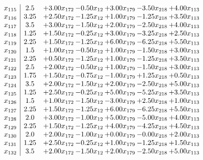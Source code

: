 \documentclass[8pt]{article}
\begin{document}
\[\begin{array}{c| c c@{\hskip 2pt} c@{\hskip 2pt} c@{\hskip 2pt} c@{\hskip 2pt} c@{\hskip 2pt} }
 x_{115}   &  2.5 & +  3.00 x_{172} & -0.50 x_{12} & +  3.00 x_{179} & -3.50 x_{218} & +  4.00 x_{113}\\
 x_{116}   &  3.25 & +  2.50 x_{172} & -1.25 x_{12} & +  1.00 x_{179} & -1.25 x_{218} & +  3.50 x_{113}\\
 x_{117}   &  3.5 & +  3.00 x_{172} & -1.50 x_{12} & +  2.00 x_{179} & -2.50 x_{218} & +  4.00 x_{113}\\
 x_{118}   &  1.25 & +  1.50 x_{172} & -0.25 x_{12} & +  3.00 x_{179} & -3.25 x_{218} & +  2.50 x_{113}\\
 x_{119}   &  2.25 & +  1.50 x_{172} & -1.25 x_{12} & +  6.00 x_{179} & -6.25 x_{218} & +  5.50 x_{113}\\
 x_{120}   &  1.5 & +  1.00 x_{172} & -0.50 x_{12} & +  1.00 x_{179} & -1.50 x_{218} & +  3.00 x_{113}\\
 x_{121}   &  2.25 & +  0.50 x_{172} & -1.25 x_{12} & +  1.00 x_{179} & -1.25 x_{218} & +  3.50 x_{113}\\
 x_{122}   &  2.5 & +  2.00 x_{172} & -0.50 x_{12} & +  1.00 x_{179} & -1.50 x_{218} & +  3.00 x_{113}\\
 x_{123}   &  1.75 & +  1.50 x_{172} & -0.75 x_{12} & -1.00 x_{179} & +  1.25 x_{218} & +  0.50 x_{113}\\
 x_{124}   &  3.5 & +  2.00 x_{172} & -1.50 x_{12} & +  2.00 x_{179} & -2.50 x_{218} & +  5.00 x_{113}\\
 x_{125}   &  1.25 & +  2.50 x_{172} & -0.25 x_{12} & +  5.00 x_{179} & -5.25 x_{218} & +  3.50 x_{113}\\
 x_{126}   &  1.5 & +  1.00 x_{172} & -1.50 x_{12} & -3.00 x_{179} & +  2.50 x_{218} & +  1.00 x_{113}\\
 x_{127}   &  2.25 & +  1.50 x_{172} & -1.25 x_{12} & +  6.00 x_{179} & -6.25 x_{218} & +  5.50 x_{113}\\
 x_{128}   &  2.0 & +  3.00 x_{172} & -1.00 x_{12} & +  5.00 x_{179} & -5.00 x_{218} & +  4.00 x_{113}\\
 x_{129}   &  2.25 & +  1.50 x_{172} & -1.25 x_{12} & +  4.00 x_{179} & -4.25 x_{218} & +  4.50 x_{113}\\
 x_{130}   &  2.0 & +  2.00 x_{172} & -1.00 x_{12} & +  0.00 x_{179} & -0.00 x_{218} & +  2.00 x_{113}\\
 x_{131}   &  1.25 & +  2.50 x_{172} & -0.25 x_{12} & +  1.00 x_{179} & -1.25 x_{218} & +  1.50 x_{113}\\
 x_{132}   &  3.5 & +  2.00 x_{172} & -1.50 x_{12} & +  2.00 x_{179} & -2.50 x_{218} & +  5.00 x_{113}\\

\end{array}\]
\end{document}
